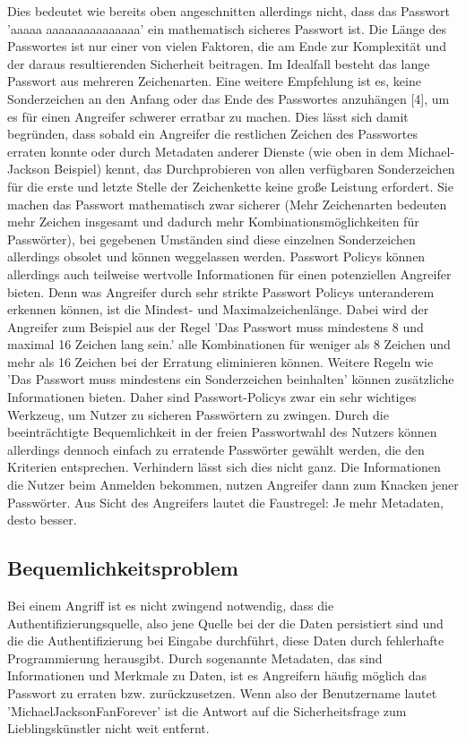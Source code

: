Dies bedeutet wie bereits oben angeschnitten allerdings nicht, dass das Passwort 'aaaaa \newline aaaaaaaaaaaaaaa' ein mathematisch sicheres Passwort ist. Die Länge des Passwortes ist nur einer von vielen Faktoren, die am Ende zur Komplexität und der daraus resultierenden Sicherheit beitragen. Im Idealfall besteht das lange Passwort aus mehreren Zeichenarten. Eine weitere Empfehlung ist es, keine Sonderzeichen an den Anfang oder das Ende des Passwortes anzuhängen [4], um es für einen Angreifer schwerer erratbar zu machen. Dies lässt sich damit begründen, dass sobald ein Angreifer die restlichen Zeichen des Passwortes erraten konnte oder durch Metadaten anderer Dienste (wie oben in dem Michael-Jackson Beispiel) kennt, das Durchprobieren von allen verfügbaren Sonderzeichen für die erste und letzte Stelle der Zeichenkette keine große Leistung erfordert. Sie machen das Passwort mathematisch zwar sicherer (Mehr Zeichenarten bedeuten mehr Zeichen insgesamt und dadurch mehr Kombinationsmöglichkeiten für Passwörter), bei gegebenen Umständen sind diese einzelnen Sonderzeichen allerdings obsolet und können weggelassen werden.
Passwort Policys können allerdings auch teilweise wertvolle Informationen für einen potenziellen Angreifer bieten. Denn was Angreifer durch sehr strikte Passwort Policys unteranderem erkennen können, ist die Mindest- und Maximalzeichenlänge. Dabei wird der Angreifer zum Beispiel aus der Regel 'Das Passwort muss mindestens 8 und maximal 16 Zeichen lang sein.' alle Kombinationen für weniger als 8 Zeichen und mehr als 16 Zeichen bei der Erratung eliminieren können. Weitere Regeln wie 'Das Passwort muss mindestens ein Sonderzeichen beinhalten' können zusätzliche Informationen bieten. Daher sind Passwort-Policys zwar ein sehr wichtiges Werkzeug, um Nutzer zu sicheren Passwörtern zu zwingen. Durch die beeinträchtigte Bequemlichkeit in der freien Passwortwahl des Nutzers können allerdings dennoch einfach zu erratende Passwörter gewählt werden, die den Kriterien entsprechen. Verhindern lässt sich dies nicht ganz. Die Informationen die Nutzer beim Anmelden bekommen, nutzen Angreifer dann zum Knacken jener Passwörter. Aus Sicht des Angreifers lautet die Faustregel: Je mehr Metadaten, desto besser.

\subsection{Bequemlichkeitsproblem}
Bei einem Angriff ist es nicht zwingend notwendig, dass die Authentifizierungsquelle, also jene Quelle bei der die Daten persistiert sind und die die Authentifizierung bei Eingabe durchführt, diese Daten durch fehlerhafte Programmierung herausgibt. Durch sogenannte Metadaten, das sind Informationen und Merkmale zu Daten, ist es Angreifern häufig möglich das Passwort zu erraten bzw. zurückzusetzen. Wenn also der Benutzername lautet 'MichaelJacksonFanForever' ist die Antwort auf die Sicherheitsfrage zum Lieblingskünstler nicht weit entfernt.

